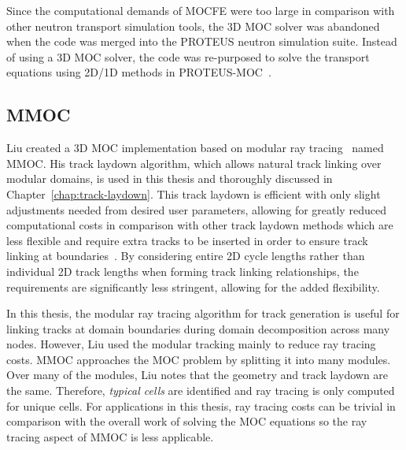 Since the computational demands of MOCFE were too large in comparison with other neutron transport simulation tools, the 3D \ac{MOC} solver was abandoned when the code was merged into the PROTEUS neutron simulation suite. Instead of using a 3D \ac{MOC} solver, the code was re-purposed to solve the transport equations using 2D/1D methods in PROTEUS-MOC~\cite{proteus}.

\subsection{MMOC}
\label{sec:mmoc}

Liu created a 3D \ac{MOC} implementation based on modular ray tracing~\cite{liu_mrt} named MMOC. His track laydown algorithm, which allows natural track linking over modular domains, is used in this thesis and thoroughly discussed in Chapter~\ref{chap:track-laydown}. This track laydown is efficient with only slight adjustments needed from desired user parameters, allowing for greatly reduced computational costs in comparison with other track laydown methods which are less flexible and require extra tracks to be inserted in order to ensure track linking at boundaries~\cite{shaner-laydown}. By considering entire 2D cycle lengths rather than individual 2D track lengths when forming track linking relationships, the requirements are significantly less stringent, allowing for the added flexibility.

In this thesis, the modular ray tracing algorithm for track generation is useful for linking tracks at domain boundaries during domain decomposition across many nodes. However, Liu used the modular tracking mainly to reduce ray tracing costs. MMOC approaches the \ac{MOC} problem by splitting it into many modules. Over many of the modules, Liu notes that the geometry and track laydown are the same. Therefore, \textit{typical cells} are identified and ray tracing is only computed for unique cells. For applications in this thesis, ray tracing costs can be trivial in comparison with the overall work of solving the \ac{MOC} equations so the ray tracing aspect of MMOC is less applicable.


